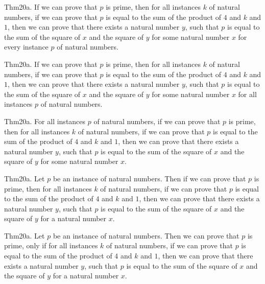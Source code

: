 \documentclass{article}
\begin{document}
Thm20a. If we can prove that $p$ is prime, then for all instances $k$ of natural numbers, if we can prove that $p$ is equal to the sum of the product of $4$ and $k$ and $1$, then we can prove that there exists a natural number $y$, such that $p$ is equal to the sum of the square of $x$ and the square of $y$ for some natural number $x$ for every instance $p$ of natural numbers.

Thm20a. If we can prove that $p$ is prime, then for all instances $k$ of natural numbers, if we can prove that $p$ is equal to the sum of the product of $4$ and $k$ and $1$, then we can prove that there exists a natural number $y$, such that $p$ is equal to the sum of the square of $x$ and the square of $y$ for some natural number $x$ for all instances $p$ of natural numbers.

Thm20a. For all instances $p$ of natural numbers, if we can prove that $p$ is prime, then for all instances $k$ of natural numbers, if we can prove that $p$ is equal to the sum of the product of $4$ and $k$ and $1$, then we can prove that there exists a natural number $y$, such that $p$ is equal to the sum of the square of $x$ and the square of $y$ for some natural number $x$.

Thm20a. Let $p$ be an instance of natural numbers. Then if we can prove that $p$ is prime, then for all instances $k$ of natural numbers, if we can prove that $p$ is equal to the sum of the product of $4$ and $k$ and $1$, then we can prove that there exists a natural number $y$, such that $p$ is equal to the sum of the square of $x$ and the square of $y$ for a natural number $x$.

Thm20a. Let $p$ be an instance of natural numbers. Then we can prove that $p$ is prime, only if for all instances $k$ of natural numbers, if we can prove that $p$ is equal to the sum of the product of $4$ and $k$ and $1$, then we can prove that there exists a natural number $y$, such that $p$ is equal to the sum of the square of $x$ and the square of $y$ for a natural number $x$.
\end{document}
